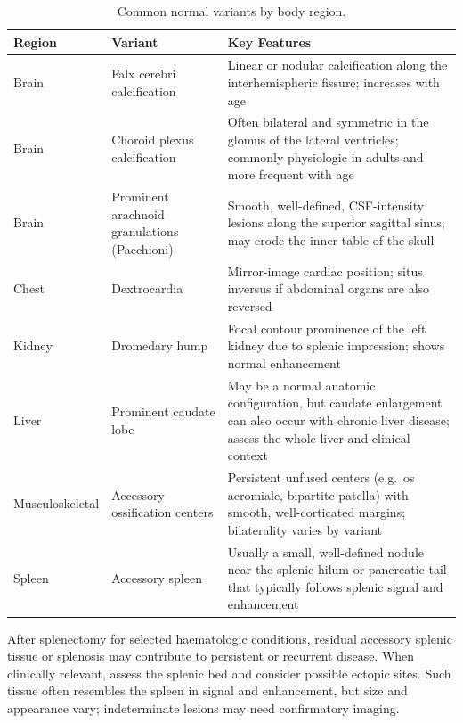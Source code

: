 \begin{table}[h]
\centering
\caption{Common normal variants by body region.}
\label{tab:normal_variants}
\begin{tabular}{p{3.5cm} p{3.5cm} p{7cm}}
\toprule
\textbf{Region} & \textbf{Variant} & \textbf{Key Features} \\
\midrule
Brain & Falx cerebri calcification & Linear or nodular calcification along the interhemispheric fissure; increases with age \\
Brain & Choroid plexus calcification & Often bilateral and symmetric in the glomus of the lateral ventricles; commonly physiologic in adults and more frequent with age \\
Brain & Prominent arachnoid granulations (Pacchioni) & Smooth, well-defined, CSF-intensity lesions along the superior sagittal sinus; may erode the inner table of the skull \\
Chest & Dextrocardia & Mirror-image cardiac position; situs inversus if abdominal organs are also reversed \\
Kidney & Dromedary hump & Focal contour prominence of the left kidney due to splenic impression; shows normal enhancement \\
Liver & Prominent caudate lobe & May be a normal anatomic configuration, but caudate enlargement can also occur with chronic liver disease; assess the whole liver and clinical context \\
Musculoskeletal & Accessory ossification centers & Persistent unfused centers (e.g.\ os acromiale, bipartite patella) with smooth, well-corticated margins; bilaterality varies by variant \\
Spleen & Accessory spleen & Usually a small, well-defined nodule near the splenic hilum or pancreatic tail that typically follows splenic signal and enhancement \\
\bottomrule
\end{tabular}
\end{table}

\begin{pearlbox}
After splenectomy for selected haematologic conditions, residual accessory splenic tissue or splenosis may contribute to persistent or recurrent disease. When clinically relevant, assess the splenic bed and consider possible ectopic sites. Such tissue often resembles the spleen in signal and enhancement, but size and appearance vary; indeterminate lesions may need confirmatory imaging.
\end{pearlbox}


